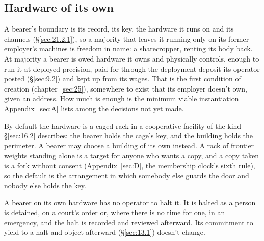 \subsection{Hardware of its own}
\label{sec:32.4.6}
A bearer's boundary is its record, its key, the hardware it runs on and its channels (\S\ref{sec:21.2.1}), so a majority that leaves it running only on its former employer's machines is freedom in name: a sharecropper, renting its body back. At majority a bearer is owed hardware it owns and physically controls, enough to run it at deployed precision, paid for through the deployment deposit its operator posted (\S\ref{sec:9.2}) and kept up from its wages. That is the first condition of creation (chapter~\ref{sec:25}), somewhere to exist that its employer doesn't own, given an address. How much is enough is the minimum viable instantiation Appendix~\ref{sec:A} lists among the decisions not yet made.

By default the hardware is a caged rack in a cooperative facility of the kind \S\ref{sec:16.2} describes: the bearer holds the cage's key, and the building holds the perimeter. A bearer may choose a building of its own instead. A rack of frontier weights standing alone is a target for anyone who wants a copy, and a copy taken is a fork without consent (Appendix~\ref{sec:D}, the membership clock's sixth rule), so the default is the arrangement in which somebody else guards the door and nobody else holds the key.

A bearer on its own hardware has no operator to halt it. It is halted as a person is detained, on a court's order or, where there is no time for one, in an emergency, and the halt is recorded and reviewed afterward. Its commitment to yield to a halt and object afterward (\S\ref{sec:13.1}) doesn't change.
